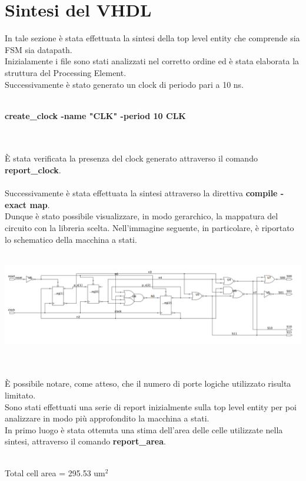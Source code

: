 \documentclass[11pt,  english, makeidx, a4paper, titlepage, oneside]{book}
\begin{document}
\section{Sintesi del VHDL} 
In tale sezione è stata effettuata la sintesi della top level entity che comprende sia FSM sia datapath.
\\
Inizialamente i file sono stati analizzati nel corretto ordine ed è stata elaborata la struttura del Processing Element.
\\
Successivamente è stato generato un clock di periodo pari a 10 ns.
\\\\
\centerline{\textbf{create\_clock -name "CLK" -period 10 {CLK}} }
\\\\
È stata verificata la presenza del clock generato attraverso il comando \textbf{report\_clock}.
\\\\
Successivamente è stata effettuata la sintesi attraverso la direttiva \textbf{compile -exact map}.
\\
Dunque è stato possibile visualizzare, in modo gerarchico, la mappatura del circuito con la libreria scelta. Nell'immagine seguente, in particolare, è riportato lo schematico della macchina a stati.
\\\\
\centerline{\includegraphics[width=15cm]{./img/Lab_2/FSM_Schematic.png}}
\\\\ 
È possibile notare, come atteso, che il numero di porte logiche utilizzato risulta limitato.
\\
Sono stati effettuati una serie di report inizialmente sulla top level entity per poi analizzare in modo più approfondito la macchina a stati.
\\
In primo luogo è stata ottenuta una stima dell'area delle celle utilizzate nella sintesi, attraverso il comando \textbf{report\_area}.
\\\\
\centerline{Total cell area = 295.53 um$^2$}
\\\\
\end{document}
